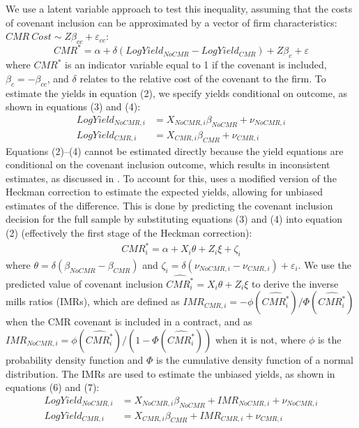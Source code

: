 \documentclass[12pt]{article}
\begin{document}
\begin{appendices}
We use a latent variable approach to test this inequality, assuming that the costs of covenant inclusion can be approximated by a vector of firm characteristics: $CMR\ Cost \sim Z \beta_{cc} + \varepsilon_{cc}$: %
%
\begin{equation}
CMR^* = \alpha + \delta (LogYield_{NoCMR} - LogYield_{CMR} ) + Z \beta_{c} + \varepsilon
\end{equation}%
%
where $CMR^*$ is an indicator variable equal to 1 if the covenant is included, $\beta_c = -\beta_{cc}$, and $\delta$ relates to the relative cost of the covenant to the firm.
To estimate the yields in equation (2), we specify yields conditional on outcome, as shown in equations (3) and (4):
\begin{align}
LogYield_{NoCMR,i} &= X_{NoCMR,i} \beta_{NoCMR} + \nu_{NoCMR,i} \\
LogYield_{CMR,i} &= X_{CMR,i} \beta_{CMR} + \nu_{CMR,i}
\end{align}
Equations (2)--(4) cannot be estimated directly because the yield equations are conditional on the covenant inclusion outcome, which results in inconsistent estimates, as discussed in \cite{Heckman_1979}.
To account for this, \cite{Lee_1978} uses a modified version of the Heckman correction to estimate the expected yields, allowing for unbiased estimates of the difference.
This is done by predicting the covenant inclusion decision for the full sample by substituting equations (3) and (4) into equation (2) (effectively the first stage of the Heckman correction): %
%
\begin{align}
CMR^*_i = \alpha + X_i \theta + Z_i \xi + \zeta_i
\end{align}%
%
where $\theta = \delta (\beta_{NoCMR} - \beta_{CMR})$ and $\zeta_i = \delta (\nu_{NoCMR,i} - \nu_{CMR,i}) + \varepsilon_{i}$.
We use the predicted value of covenant inclusion $\widehat{CMR^{*}_{i}} = X_i \theta + Z_i \xi$ to derive the inverse mills ratios (IMRs), which are defined as $IMR_{CMR,i} = -\phi (\widehat{CMR^{*}_{i}}) / \Phi(\widehat{CMR^{*}_{i}})$ when the CMR covenant is included in a contract, and as $IMR_{NoCMR,i} = \phi (\widehat{CMR^{*}_{i}}) / \left( 1 - \Phi(\widehat{CMR^{*}_{i}}) \right)$ when it is not, where $\phi$ is the probability density function and $\Phi$ is the cumulative density function of a normal distribution.
The IMRs are used to estimate the unbiased yields, as shown in equations (6) and (7):
\begin{align}
LogYield_{NoCMR,i} &= X_{NoCMR,i} \beta_{NoCMR} + IMR_{NoCMR,i} + \nu_{NoCMR,i} \\
LogYield_{CMR,i} &= X_{CMR,i} \beta_{CMR} + IMR_{CMR,i} + \nu_{CMR,i}
\end{align}


\end{appendices}
\end{document}
